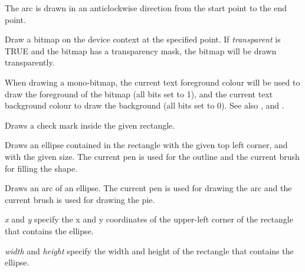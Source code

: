 The arc is drawn in an anticlockwise direction from the start point to the end point.

\label{wxdcdrawbitmap}


Draw a bitmap on the device context at the specified point. If {\it transparent} is TRUE and the bitmap has
a transparency mask, the bitmap will be drawn transparently.

When drawing a mono-bitmap, the current text foreground colour will be used to draw the foreground
of the bitmap (all bits set to 1), and the current text background colour to draw the background
(all bits set to 0). See also , 
 and .

\label{wxdcdrawcheckmark}



Draws a check mark inside the given rectangle.

\label{wxdcdrawellipse}


Draws an ellipse contained in the rectangle with the given top left corner, and with the
given size.  The current pen is used for the outline and the current brush for
filling the shape.

\label{wxdcdrawellipticarc}


Draws an arc of an ellipse. The current pen is used for drawing the arc and
the current brush is used for drawing the pie.

{\it x} and {\it y} specify the x and y coordinates of the upper-left corner of the rectangle that contains
the ellipse.

{\it width} and {\it height} specify the width and height of the rectangle that contains
the ellipse.

